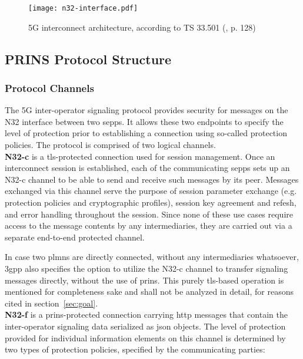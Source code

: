 \begin{figure}[ht!]
    \texttt{[image: n32-interface.pdf]}
    \centering
    \caption{5G interconnect architecture, according to TS 33.501 (\cite{3gpp.33.501}, p. 128)}
    \label{fig:n32}
\end{figure}

\subsection{PRINS Protocol Structure}
\subsubsection{Protocol Channels}

The 5G inter-operator signaling protocol provides security for messages on the N32 interface between two \glspl{sepp}.
It allows these two endpoints to specify the level of protection prior to establishing a connection using so-called protection policies.
The protocol is comprised of two logical channels.
\\

\textbf{N32-c} is a \gls{tls}-protected connection used for session management.
Once an interconnect session is established, each of the communicating \glspl{sepp} sets up an N32-c channel to be able to send and receive such messages by its peer.
Messages exchanged via this channel serve the purpose of session parameter exchange (e.g. protection policies and cryptographic profiles), session key agreement and refesh, and error handling throughout the session.
Since none of these use cases require access to the message contents by any intermediaries, they are carried out via a separate end-to-end protected channel.

In case two \glspl{plmn} are directly connected, without any intermediaries whatsoever, \gls{3gpp} also specifies the option to utilize the N32-c channel to transfer signaling messages directly, without the use of \gls{prins}.
This purely \gls{tls}-based operation is mentioned for completeness sake and shall not be analyzed in detail, for reasons cited in section~\ref{sec:goal}.
\\

\textbf{N32-f} is a \gls{prins}-protected connection carrying \gls{http} messages that contain the inter-operator signaling data serialized as \gls{json} objects.
The level of protection provided for individual information elements on this channel is determined by two types of protection policies, specified by the communicating parties:

